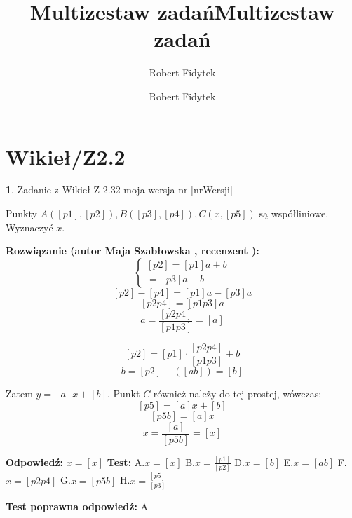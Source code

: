 \documentclass[12pt, a4paper]{article}
\title{Multizestaw zadań}
\author{Robert Fidytek}
\date{}\documentclass[12pt, a4paper]{article}
\title{Multizestaw zadań}
\author{Robert Fidytek}
\date{}
\theoremstyle{definition} %
\newtheorem{zad}{}
\theoremstyle{definition} %
\newtheorem{zad}{}
\newcommand{\kategoria}[1]{\section{#1}} %
\newcommand{\zadStart}[1]{\begin{zad}#1\newline} %
\newcommand{\zadStop}{\end{zad}}   %
\newcommand{\rozwStart}[2]{\noindent \textbf{Rozwiązanie (autor #1 , recenzent #2): }\newline} %
\newcommand{\rozwStop}{\newline}                                            %
\newcommand{\odpStart}{\noindent \textbf{Odpowiedź:}\newline}    %
\newcommand{\odpStop}{\newline}                                             %
\newcommand{\testStart}{\noindent \textbf{Test:}\newline} %
\newcommand{\testStop}{\newline} %
\newcommand{\kluczStart}{\noindent \textbf{Test poprawna odpowiedź:}\newline} %
\newcommand{\kluczStop}{\newline} %
\begin{document}
\maketitle


\kategoria{Wikieł/Z2.2}
\zadStart{Zadanie z Wikieł Z 2.32  moja wersja nr [nrWersji]}

Punkty $A([p1],[p2]), B([p3],[p4]), C(x,[p5])$ są współliniowe. Wyznaczyć $x$.
\zadStop

\rozwStart{Maja Szabłowska}{}
$$\left\{ \begin{array}{ll}
[p2]=[p1]a+b\\
[p4]=[p3]a+b
\end{array} \right.$$
$$[p2]-[p4]=[p1]a-[p3]a$$
$$[p2p4]=[p1p3]a$$
$$a=\frac{[p2p4]}{[p1p3]}=[a]$$

$$[p2]=[p1]\cdot\frac{[p2p4]}{[p1p3]}+b $$
$$b=[p2]-([ab])=[b]$$

Zatem $y=[a]x+[b].$ Punkt $C$ również należy do tej prostej, wówczas:
$$[p5]=[a]x+[b]$$
$$[p5b]=[a]x$$
$$x=\frac{[a]}{[p5b]}=[x]$$

\rozwStop


\odpStart
$x=[x]$
\odpStop
\testStart
A.$x=[x]$
B.$x=\frac{[p1]}{[p2]}$
D.$x=[b]$
E.$x=[ab]$
F.$x=[p2p4]$
G.$x=[p5b]$
H.$x=\frac{[p5]}{[p3]}$

\testStop
\kluczStart
A
\kluczStop
\end{document}
